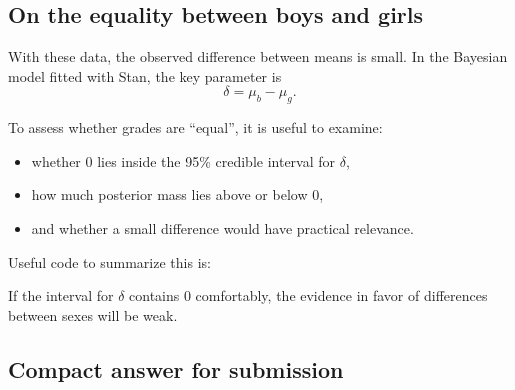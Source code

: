 \documentclass[
  12pt,
]{article}
\newenvironment{Shaded}{\begin{snugshade}}{\end{snugshade}}
\newcommand{\AttributeTok}[1]{\textcolor[rgb]{0.13,0.29,0.53}{#1}}
\newcommand{\DecValTok}[1]{\textcolor[rgb]{0.00,0.00,0.81}{#1}}
\newcommand{\FloatTok}[1]{\textcolor[rgb]{0.00,0.00,0.81}{#1}}
\newcommand{\FunctionTok}[1]{\textcolor[rgb]{0.13,0.29,0.53}{\textbf{#1}}}
\newcommand{\NormalTok}[1]{#1}
\newcommand{\OtherTok}[1]{\textcolor[rgb]{0.56,0.35,0.01}{#1}}
\newcommand{\SpecialCharTok}[1]{\textcolor[rgb]{0.81,0.36,0.00}{\textbf{#1}}}
\providecommand{\tightlist}{%
  \setlength{\itemsep}{0pt}\setlength{\parskip}{0pt}}
\begin{document}
\subsection{On the equality between boys and
girls}\label{on-the-equality-between-boys-and-girls}

With these data, the observed difference between means is small. In the
Bayesian model fitted with Stan, the key parameter is \[
\delta = \mu_b - \mu_g.
\]

To assess whether grades are ``equal'', it is useful to examine:

\begin{itemize}
\tightlist
\item
  whether 0 lies inside the 95\% credible interval for \(\delta\),
\item
  how much posterior mass lies above or below 0,
\item
  and whether a small difference would have practical relevance.
\end{itemize}

Useful code to summarize this is:

\begin{Shaded}
\end{Shaded}

If the interval for \(\delta\) contains 0 comfortably, the evidence in
favor of differences between sexes will be weak.

\subsection{Compact answer for
submission}\label{compact-answer-for-submission}
\end{document}
